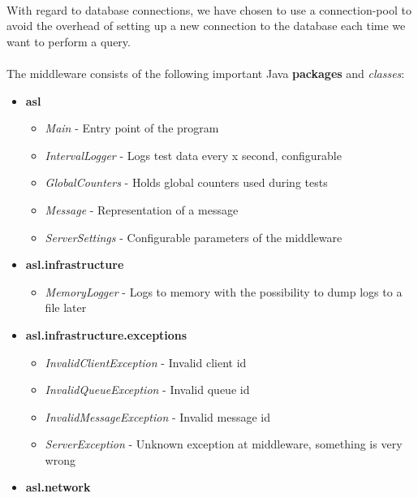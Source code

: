 \documentclass{article}
\begin{document}
            \\
            With regard to database connections, we have chosen to use a connection-pool to avoid the overhead of setting up a new connection to the database each time we want to perform a query.\\
            \\
            The middleware consists of the following important Java \textbf{packages} and \textit{classes}:
            \begin{itemize}
                \item \textbf{asl}
                \begin{itemize}
                    \item \textit{Main} - Entry point of the program
                    \item \textit{IntervalLogger} - Logs test data every x second, configurable
                    \item \textit{GlobalCounters} - Holds global counters used during tests
                    \item \textit{Message} - Representation of a message
                    \item \textit{ServerSettings} - Configurable parameters of the middleware
                \end{itemize}
                \item \textbf{asl.infrastructure}
                \begin{itemize}
                    \item \textit{MemoryLogger} - Logs to memory with the possibility to dump logs to a file later
                \end{itemize}
                \item \textbf{asl.infrastructure.exceptions}
                \begin{itemize}
                    \item \textit{InvalidClientException} - Invalid client id
                    \item \textit{InvalidQueueException} - Invalid queue id
                    \item \textit{InvalidMessageException} - Invalid message id
                    \item \textit{ServerException} - Unknown exception at middleware, something is very wrong
                \end{itemize}
                \item \textbf{asl.network}
                \begin{itemize}

\end{itemize}
\end{itemize}
\end{document}
